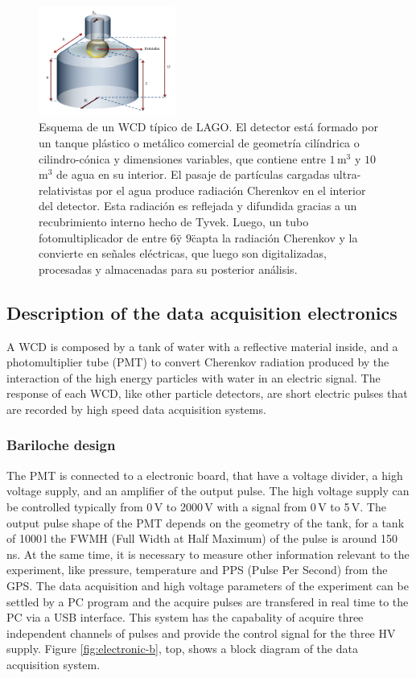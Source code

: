\begin{figure}
  \begin{center}
    \includegraphics[width=0.4\textwidth]{images/detector.png}
    \caption{Esquema de un WCD típico de LAGO. El detector está formado por un
tanque plástico o metálico comercial de geometría cilíndrica o cilindro-cónica
y dimensiones variables, que contiene entre $1$\,m$^3$ y $10$\,m$^3$ de agua en
su interior. El pasaje de partículas cargadas ultra-relativistas por el agua
produce radiación Cherenkov en el interior del detector. Esta radiación es
reflejada y difundida gracias a un recubrimiento interno hecho de Tyvek. Luego,
un tubo fotomultiplicador de entre $6$\" y $9$\" capta la radiación Cherenkov y
la convierte en señales eléctricas, que luego son digitalizadas, procesadas y
almacenadas para su posterior análisis.} \label{WCDEsquema}
  \end{center}
\end{figure}

\subsection{Description of the data acquisition electronics}\label{sec:electronics}

A WCD is composed by a tank of water with a reflective material inside, and a
photomultiplier tube (PMT) to convert Cherenkov radiation produced by the
interaction of the high energy particles with water in an electric signal. The
response of each WCD, like other particle detectors, are short electric pulses
that are recorded by high speed data acquisition systems.

\subsubsection*{Bariloche design}

The PMT is connected to a electronic board, that have a voltage divider, a high
voltage supply, and an amplifier of the output pulse. The high voltage supply
can be controlled typically from 0\,V to 2000\,V with a signal from 0\,V to
5\,V. The output pulse shape of the PMT depends on the geometry of the tank,
for a tank of 1000\,l the FWMH (Full Width at Half Maximum) of the pulse is
around 150\,ns. At the same time, it is necessary to measure other information
relevant to the experiment, like pressure, temperature and PPS (Pulse Per
Second) from the GPS. The data acquisition and high voltage parameters of the
experiment can be settled by a PC program and the acquire pulses are transfered
in real time to the PC via a USB interface. This system has the capabality of
acquire three independent channels of pulses and provide the control signal for
the three HV supply.  Figure \ref{fig:electronic-b}, top, shows a block diagram
of the data acquisition system.

